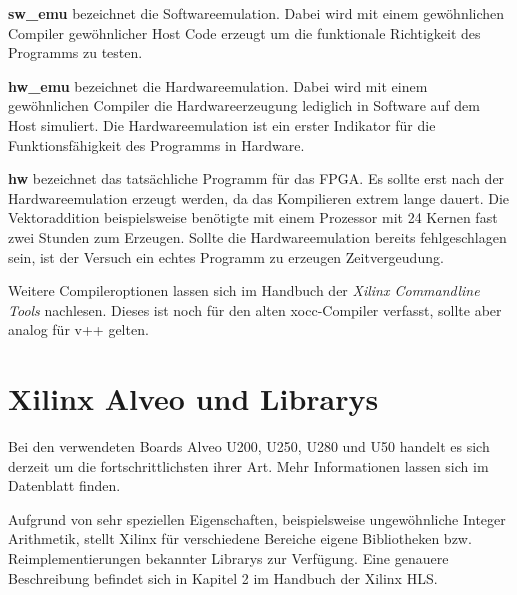 		\textbf{sw{\_}emu} bezeichnet die Softwareemulation. Dabei wird mit einem gewöhnlichen Compiler gewöhnlicher Host Code erzeugt um die funktionale Richtigkeit des Programms zu testen.
		
		\textbf{hw{\_}emu} bezeichnet die Hardwareemulation. Dabei wird mit einem gewöhnlichen Compiler die Hardwareerzeugung lediglich in Software auf dem Host simuliert. Die Hardwareemulation ist ein erster Indikator für die Funktionsfähigkeit des Programms in Hardware.
		
		\textbf{hw} bezeichnet das tatsächliche Programm für das FPGA. Es sollte erst nach der Hardwareemulation erzeugt werden, da das Kompilieren extrem lange dauert. Die Vektoraddition beispielsweise benötigte mit einem Prozessor mit 24 Kernen fast zwei Stunden zum Erzeugen. Sollte die Hardwareemulation bereits fehlgeschlagen sein, ist der Versuch ein echtes Programm zu erzeugen Zeitvergeudung.
		
		Weitere Compileroptionen lassen sich im Handbuch der \textit{Xilinx Commandline Tools} nachlesen. \autocite{xocc} Dieses ist noch für den alten xocc-Compiler verfasst, sollte aber analog für v++ gelten.


		\section{Xilinx Alveo und Librarys}
		Bei den verwendeten Boards Alveo U200, U250, U280 und U50 handelt es sich derzeit um die fortschrittlichsten ihrer Art. Mehr Informationen lassen sich im Datenblatt finden. \autocite{alveo}
		
		Aufgrund von sehr speziellen Eigenschaften, beispielsweise ungewöhnliche Integer Arithmetik, stellt Xilinx für verschiedene Bereiche eigene Bibliotheken bzw. Reimplementierungen bekannter Librarys zur Verfügung. Eine genauere Beschreibung befindet sich in Kapitel 2 im Handbuch der Xilinx HLS. \autocite{hls}
		
